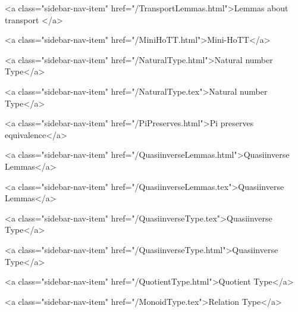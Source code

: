       
        
          <a class="sidebar-nav-item" href="/TransportLemmas.html">Lemmas about transport </a>
        
      
    
      
        
          <a class="sidebar-nav-item" href="/MiniHoTT.html">Mini-HoTT</a>
        
      
    
      
        
          <a class="sidebar-nav-item" href="/NaturalType.html">Natural number Type</a>
        
      
    
      
        
          <a class="sidebar-nav-item" href="/NaturalType.tex">Natural number Type</a>
        
      
    
      
        
          <a class="sidebar-nav-item" href="/PiPreserves.html">Pi preserves equivalence</a>
        
      
    
      
        
          <a class="sidebar-nav-item" href="/QuasiinverseLemmas.html">Quasiinverse Lemmas</a>
        
      
    
      
        
          <a class="sidebar-nav-item" href="/QuasiinverseLemmas.tex">Quasiinverse Lemmas</a>
        
      
    
      
        
          <a class="sidebar-nav-item" href="/QuasiinverseType.tex">Quasiinverse Type</a>
        
      
    
      
        
          <a class="sidebar-nav-item" href="/QuasiinverseType.html">Quasiinverse Type</a>
        
      
    
      
        
          <a class="sidebar-nav-item" href="/QuotientType.html">Quotient Type</a>
        
      
    
      
        
          <a class="sidebar-nav-item" href="/MonoidType.tex">Relation Type</a>
        
